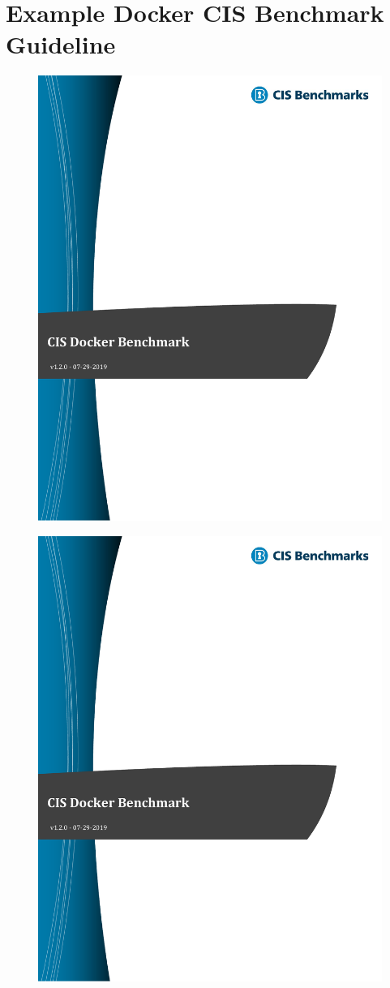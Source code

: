 \chapter{Example Docker CIS Benchmark Guideline}\label{appendix:CIS-Benchmark-Example}

\begin{figure}[ht]
    \centering
    \includegraphics[page=135,width=.8\linewidth]{resources/images/cis_docker_benchmarks.pdf}
\end{figure}

\pagebreak

\begin{figure}[ht]
    \centering
    \includegraphics[page=136,width=.8\textwidth]{resources/images/cis_docker_benchmarks.pdf}
\end{figure}

